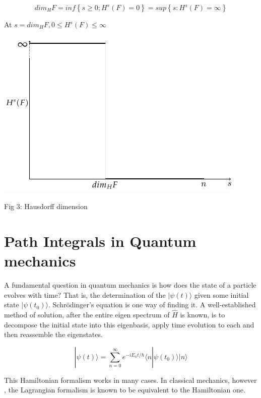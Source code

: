 \documentclass[14pt]{extarticle}
\begin{document}
$$ dim_H F =inf \left\lbrace s \geq 0; H^s(F)=0 \right\rbrace = sup \left\lbrace s: H^s(F)=\infty \right\rbrace$$ 

At $ s=dim_H F, 0\leq H^s(F) \leq \infty$

\begin{center}

\includegraphics[scale=1]{1111.png}
\linebreak

Fig 3: Hausdorff dimension

\end{center}

\newpage


\section{Path Integrals in Quantum mechanics}

A fundamental question in quantum mechanics is how does the state of a particle evolves with time? That is, the determination of the   $|\psi(t)\rangle$ given some initial state $|\psi(t_0)\rangle$. Schrödinger’s equation is one way of finding it. A well-established method of solution, after the entire eigen spectrum of $\hat{H}$ is known, is to decompose the initial state into this eigenbasis, apply time evolution to each and then reassemble the eigenstates.

$$|\psi(t)\rangle = \sum_{n=0}^{\infty} e^{-iE_n t/\hbar} \langle n|\psi(t_0) \rangle |n \rangle$$

This Hamiltonian formalism works in many cases. In classical mechanics, however , the Lagrangian formalism is known to be equivalent to the Hamiltonian one.\\
\end{document}
